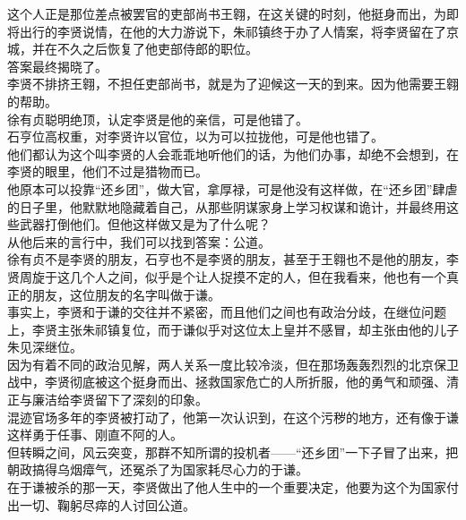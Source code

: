 \begin{multicols}{\theparacolNo}
这个人正是那位差点被罢官的吏部尚书王翱，在这关键的时刻，他挺身而出，为即将出行的李贤说情，在他的大力游说下，朱祁镇终于办了人情案，将李贤留在了京城，并在不久之后恢复了他吏部侍郎的职位。\\

答案最终揭晓了。\\

李贤不排挤王翱，不担任吏部尚书，就是为了迎候这一天的到来。因为他需要王翱的帮助。\\

徐有贞聪明绝顶，认定李贤是他的亲信，可是他错了。\\

石亨位高权重，对李贤许以官位，以为可以拉拢他，可是他也错了。\\

他们都认为这个叫李贤的人会乖乖地听他们的话，为他们办事，却绝不会想到，在李贤的眼里，他们不过是猎物而已。\\

他原本可以投靠“还乡团”，做大官，拿厚禄，可是他没有这样做，在“还乡团”肆虐的日子里，他默默地隐藏着自己，从那些阴谋家身上学习权谋和诡计，并最终用这些武器打倒他们。但他这样做又是为了什么呢？\\

从他后来的言行中，我们可以找到答案：公道。\\

徐有贞不是李贤的朋友，石亨也不是李贤的朋友，甚至于王翱也不是他的朋友，李贤周旋于这几个人之间，似乎是个让人捉摸不定的人，但在我看来，他也有一个真正的朋友，这位朋友的名字叫做于谦。\\

事实上，李贤和于谦的交往并不紧密，而且他们之间也有政治分歧，在继位问题上，李贤主张朱祁镇复位，而于谦似乎对这位太上皇并不感冒，却主张由他的儿子朱见深继位。\\

因为有着不同的政治见解，两人关系一度比较冷淡，但在那场轰轰烈烈的北京保卫战中，李贤彻底被这个挺身而出、拯救国家危亡的人所折服，他的勇气和顽强、清正与廉洁给李贤留下了深刻的印象。\\

混迹官场多年的李贤被打动了，他第一次认识到，在这个污秽的地方，还有像于谦这样勇于任事、刚直不阿的人。\\

但转瞬之间，风云突变，那群不知所谓的投机者——“还乡团”一下子冒了出来，把朝政搞得乌烟瘴气，还冤杀了为国家耗尽心力的于谦。\\

在于谦被杀的那一天，李贤做出了他人生中的一个重要决定，他要为这个为国家付出一切、鞠躬尽瘁的人讨回公道。\\


\end{multicols}
